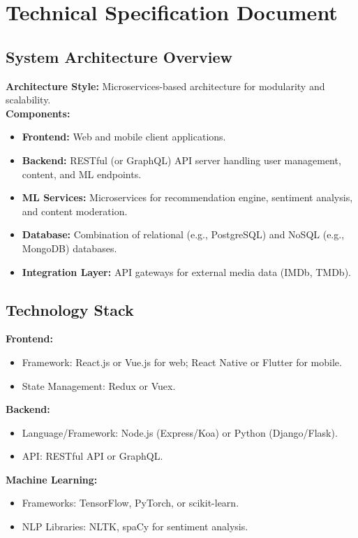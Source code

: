 \documentclass[11pt]{article}
\begin{document}
\newpage
\section{Technical Specification Document}

\subsection{System Architecture Overview}
\textbf{Architecture Style:} Microservices-based architecture for modularity and scalability.\\[2mm]
\textbf{Components:}
\begin{itemize}[noitemsep]
    \item \textbf{Frontend:} Web and mobile client applications.
    \item \textbf{Backend:} RESTful (or GraphQL) API server handling user management, content, and ML endpoints.
    \item \textbf{ML Services:} Microservices for recommendation engine, sentiment analysis, and content moderation.
    \item \textbf{Database:} Combination of relational (e.g., PostgreSQL) and NoSQL (e.g., MongoDB) databases.
    \item \textbf{Integration Layer:} API gateways for external media data (IMDb, TMDb).
\end{itemize}

\subsection{Technology Stack}
\textbf{Frontend:}
\begin{itemize}[noitemsep]
    \item Framework: React.js or Vue.js for web; React Native or Flutter for mobile.
    \item State Management: Redux or Vuex.
\end{itemize}

\textbf{Backend:}
\begin{itemize}[noitemsep]
    \item Language/Framework: Node.js (Express/Koa) or Python (Django/Flask).
    \item API: RESTful API or GraphQL.
\end{itemize}

\textbf{Machine Learning:}
\begin{itemize}[noitemsep]
    \item Frameworks: TensorFlow, PyTorch, or scikit-learn.
    \item NLP Libraries: NLTK, spaCy for sentiment analysis.
\end{itemize}
\end{document}

